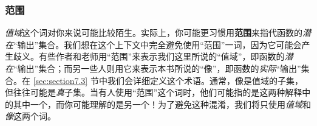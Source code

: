\subsubsection*{范围}

\emph{值域}这个词对你来说可能比较陌生。实际上，你可能更习惯用\textbf{范围}来指代函数的\emph{潜在}``输出''集合。我们想在这个上下文中完全避免使用``范围''一词，因为它可能会产生歧义。有些作者和老师用``范围''来表示我们这里所说的``值域''，即函数的\emph{潜在}``输出''集合；而另一些人则用它来表示本书所说的``像''，即函数的\emph{实际}``输出''集合。在 \ref{sec:section7.3} 节中我们会详细定义这个术语。通常，像是值域的子集，但往往可能是\emph{真}子集。当有人使用``范围''这个词时，他们可能指的是这两种解释中的其中一个，而你可能理解的是另一个！为了避免这种混淆，我们将只使用\emph{值域}和\emph{像}这两个词。